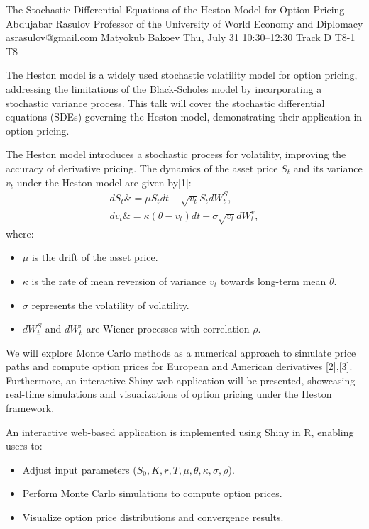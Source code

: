 \begin{talk}
  {The Stochastic Differential Equations of the Heston Model for Option Pricing}%
  {Abdujabar Rasulov}%
  {Professor of the University of World Economy and Diplomacy}%
  {asrasulov@gmail.com}%
  {Matyokub Bakoev}%
  {}%
  {Thu, July 31 10:30–12:30 Track D}%
  {T8-1}%
  {T8}%
  
							
The Heston model is a widely used stochastic volatility model for option pricing, addressing the limitations of the Black-Scholes model by incorporating a stochastic variance process. This talk will cover the stochastic differential equations (SDEs) governing the Heston model, demonstrating their application in option pricing. 

The Heston model introduces a stochastic process for volatility, improving the accuracy of derivative pricing. 
The dynamics of the asset price $S_t$ and its variance $v_t$ under the Heston model are given by[1]:
\begin{align}
    dS_t \&= \mu S_t dt + \sqrt{v_t} S_t dW_t^S, \\
    dv_t \&= \kappa(\theta - v_t) dt + \sigma \sqrt{v_t} dW_t^v,
\end{align}
where:
\begin{itemize}
    \item $\mu$ is the drift of the asset price.
    \item $\kappa$ is the rate of mean reversion of variance $v_t$ towards long-term mean $\theta$.
    \item $\sigma$ represents the volatility of volatility.
    \item $dW_t^S$ and $dW_t^v$ are Wiener processes with correlation $\rho$.
\end{itemize}

We will explore Monte Carlo methods as a numerical approach to simulate price paths and compute option prices for European and American derivatives [2],[3]. Furthermore, an interactive Shiny web application will be presented, showcasing real-time simulations and visualizations of option pricing under the Heston framework.

An interactive web-based application is implemented using Shiny in R, enabling users to:
\begin{itemize}
    \item Adjust input parameters ($S_0, K, r, T, \mu, \theta, \kappa, \sigma, \rho$).
    \item Perform Monte Carlo simulations to compute option prices.
    \item Visualize option price distributions and convergence results.
\end{itemize}


\end{talk}
